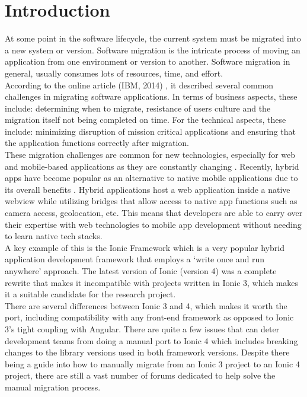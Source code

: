 \documentclass[conference]{IEEEtran}
\begin{document}
\section{Introduction}
At some point in the software lifecycle, the current system must be migrated into a new system or version.
Software migration is the intricate process of moving an application from one environment or version to another.
Software migration in general, usually consumes lots of resources, time, and effort.
\\ According to the online article (IBM, 2014) \cite{b1}, it described several common challenges in migrating software applications. In terms of business aspects, these include: determining when to migrate, resistance of users culture and the migration itself not being completed on time.
For the technical aspects, these include: minimizing disruption of mission critical applications and ensuring that the application functions correctly after migration.
\\ These migration challenges are common for new technologies, especially for web and mobile-based applications as they are constantly changing \cite{b5}. Recently, hybrid apps have become popular as an alternative to native mobile applications due to its overall benefits \cite{b2}. Hybrid applications host a web application inside a
native webview while utilizing bridges that allow access to native app functions such as camera access, geolocation, etc.
This means that developers are able to carry over their expertise with web technologies to mobile app development without needing to learn native tech stacks.
\\ A key example of this is the Ionic Framework which is a very popular hybrid application development framework that employs a ‘write once and run anywhere’ \cite{b3} approach. The latest version of Ionic (version 4) was
a complete rewrite that makes it incompatible with projects written in Ionic 3, which makes it a suitable candidate for the research project.
\\ There are several differences between Ionic 3 and 4, which makes it worth the port, including compatibility with any front-end framework as opposed to Ionic 3’s tight coupling with Angular.
There are quite a few issues that can deter development teams from doing a manual port to Ionic 4 which includes breaking changes to the library versions used in both framework versions. Despite there being a guide into how to manually migrate from an Ionic 3 project to an Ionic 4 project,
there are still a vast number of forums dedicated to help solve the manual migration process.
\end{document}
